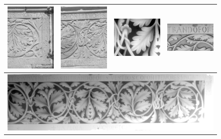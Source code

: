\begin{figure}
\begin{tabular}{||c|c|c|c||}
   \hline \hline 
   \includegraphics[width=40mm]{FIGS/SAMPLES/FRISE-IM1.jpg} &
   \includegraphics[width=40mm]{FIGS/SAMPLES/FRISE-IM2.jpg} &
   \includegraphics[width=40mm]{FIGS/SAMPLES/FRISE-Det1-F8Bits.jpg}&
   \includegraphics[width=40mm]{FIGS/SAMPLES/FRISE-Detail-ScaledShade.jpg} \\ \hline  \hline 
   \multicolumn{4}{|c|}{\vspace{2mm} \includegraphics[width=160mm]{FIGS/SAMPLES/FriseDepthBits.jpg}} \\ \hline  \hline

\end{tabular}
\end{figure}
